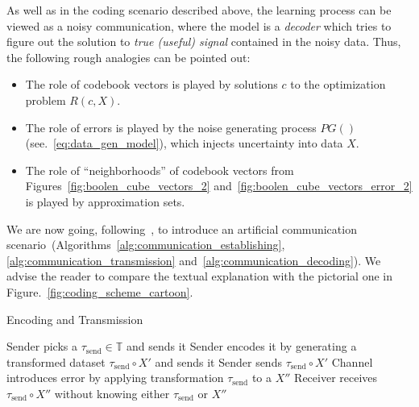 As well as in the coding scenario described above, the learning process can be
viewed as a noisy communication, where the model is a \textit{decoder} which tries
to figure out the solution to \textit{true (useful) signal} contained in the
noisy data. Thus, the following rough analogies can be pointed out:
\begin{itemize}
  \item The role of codebook vectors is played by solutions $c$ to the optimization
    problem $R(c,X)$.
  \item The role of errors is played by the noise generating process $PG()$
    (see.~\eqref{eq:data_gen_model}), which injects uncertainty into data $X$.
  \item The role of ``neighborhoods'' of codebook vectors from
    Figures~\ref{fig:boolen_cube_vectors_2}
    and~\ref{fig:boolen_cube_vectors_error_2} is played by approximation
    sets.
\end{itemize}

We are now going, following~\cite{conf/isit/Buhmann10}, to introduce an
artificial communication scenario~(Algorithms~\ref{alg:communication_establishing},
\ref{alg:communication_transmission} and~\ref{alg:communication_decoding}).
We advise the reader to compare the textual explanation with the pictorial one 
in Figure.~\ref{fig:coding_scheme_cartoon}.

\begin{algorithm}[bh!]
\caption{Encoding and Transmission}\label{alg:communication_transmission}
  
{Sender picks a $\tau_{\text{send}} \in \mathbb{T}$ and sends it\;}
{Sender encodes it by generating 
  a transformed dataset $\tau_{\text{send}} \circ X'$ and sends it\;}
{Sender sends $\tau_{\text{send}} \circ X'$\;}
{Channel introduces error by applying transformation $\tau_{\text{send}}$ to a $X''$\;}
{Receiver receives $\tau_{\text{send}} \circ X''$ without knowing either $\tau_{\text{send}}$ or $X''$\;}
\end{algorithm}

